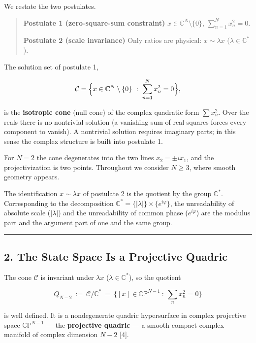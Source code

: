 \documentclass[
  a4paper,
]{article}
\begin{document}
We restate the two postulates.

\begin{quote}
\textbf{Postulate 1 (zero-square-sum constraint)}
\(x\in\mathbb C^N\setminus\{0\}\),
\(\displaystyle\sum_{n=1}^N x_n^2=0\).

\textbf{Postulate 2 (scale invariance)} Only ratios are physical:
\(x\sim\lambda x\) (\(\lambda\in\mathbb C^\ast\)).
\end{quote}

The solution set of postulate 1,

\[
\mathcal C=\Bigl\{x\in\mathbb C^N\setminus\{0\}\ :\ \sum_{n=1}^N x_n^2=0\Bigr\},
\]

is the \textbf{isotropic cone} (null cone) of the complex quadratic form
\(\sum x_n^2\). Over the reals there is no nontrivial solution (a
vanishing sum of real squares forces every component to vanish). A
nontrivial solution requires imaginary parts; in this sense the complex
structure is built into postulate 1.

For \(N=2\) the cone degenerates into the two lines \(x_2=\pm ix_1\),
and the projectivization is two points. Throughout we consider
\(N\ge3\), where smooth geometry appears.

The identification \(x\sim\lambda x\) of postulate 2 is the quotient by
the group \(\mathbb C^\ast\). Corresponding to the decomposition
\(\mathbb C^\ast=\{|\lambda|\}\times\{e^{i\varphi}\}\), the
unreadability of absolute scale (\(|\lambda|\)) and the unreadability of
common phase (\(e^{i\varphi}\)) are the modulus part and the argument
part of one and the same group.

\begin{center}\rule{0.5\linewidth}{0.5pt}\end{center}

\subsection{2. The State Space Is a Projective
Quadric}\label{the-state-space-is-a-projective-quadric}

The cone \(\mathcal C\) is invariant under \(\lambda x\)
(\(\lambda\in\mathbb C^\ast\)), so the quotient

\[
Q_{N-2}\ :=\ \mathcal C/\mathbb C^\ast\ =\ \bigl\{[x]\in\mathbb{CP}^{N-1}\ :\ \textstyle\sum_n x_n^2=0\bigr\}
\]

is well defined. It is a nondegenerate quadric hypersurface in complex
projective space \(\mathbb{CP}^{N-1}\) --- the \textbf{projective
quadric} --- a smooth compact complex manifold of complex dimension
\(N-2\) {[}4{]}.
\end{document}
